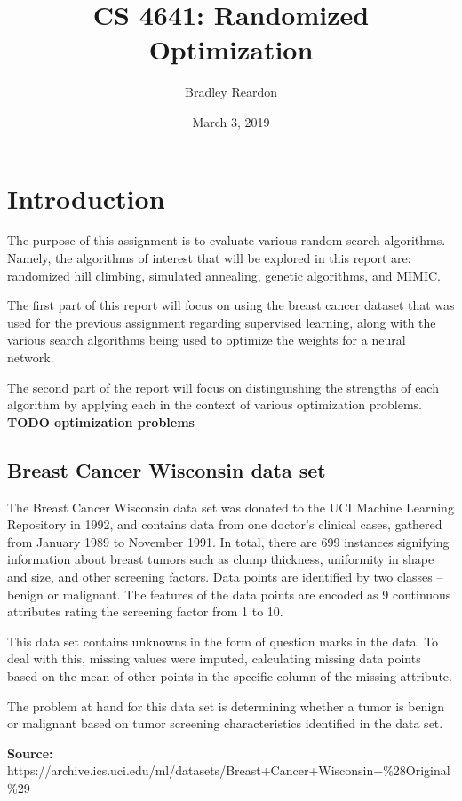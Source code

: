 \documentclass{article}
\title{\textbf{CS 4641:} Randomized Optimization}
\author{Bradley Reardon}
\date{March 3, 2019}
\begin{document}
  \maketitle

  \section{Introduction}
  The purpose of this assignment is to evaluate various random search algorithms. Namely, the algorithms of interest that will be explored in this report are: randomized hill climbing, simulated annealing, genetic algorithms, and MIMIC.

  The first part of this report will focus on using the breast cancer dataset that was used for the previous assignment regarding supervised learning, along with the various search algorithms being used to optimize the weights for a neural network.

  The second part of the report will focus on distinguishing the strengths of each algorithm by applying each in the context of various optimization problems. \textbf{TODO optimization problems} 

  \subsection{Breast Cancer Wisconsin data set}
  The Breast Cancer Wisconsin data set was donated to the UCI Machine Learning Repository in 1992, and contains data from one doctor's clinical cases, gathered from January 1989 to November 1991. In total, there are 699 instances signifying information about breast tumors such as clump thickness, uniformity in shape and size, and other screening factors. Data points are identified by two classes -- benign or malignant. The features of the data points are encoded as 9 continuous attributes rating the screening factor from 1 to 10.

  This data set contains unknowns in the form of question marks in the data. To deal with this, missing values were imputed, calculating missing data points based on the mean of other points in the specific column of the missing attribute. 

  The problem at hand for this data set is determining whether a tumor is benign or malignant based on tumor screening characteristics identified in the data set.

  \textbf{Source:} https://archive.ics.uci.edu/ml/datasets/Breast+Cancer+Wisconsin+\%28Original\%29

    
\end{document}
